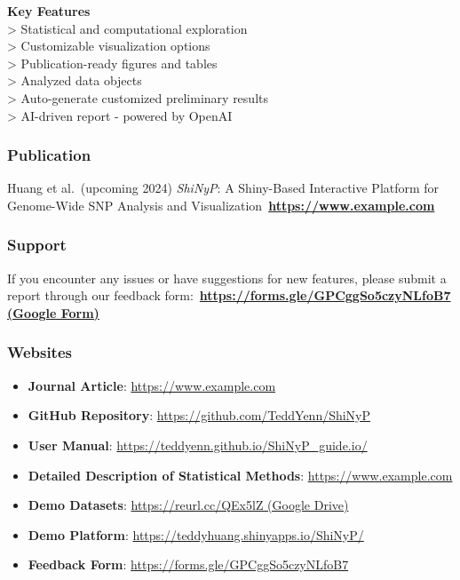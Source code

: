 \documentclass[
]{book}
\begin{document}
\textbf{Key Features}\\
\textgreater{} Statistical and computational exploration\\
\textgreater{} Customizable visualization options\\
\textgreater{} Publication-ready figures and tables\\
\textgreater{} Analyzed data objects\\
\textgreater{} Auto-generate customized preliminary results\\
\textgreater{} AI-driven report - powered by OpenAI

\subsubsection*{Publication}\label{publication}

Huang et al.~(upcoming 2024) \emph{ShiNyP}: A Shiny-Based Interactive Platform for Genome-Wide SNP Analysis and Visualization~\href{https://www.example.com/}{\textbf{https://www.example.com}}

\subsubsection*{Support}\label{support}

If you encounter any issues or have suggestions for new features, please submit a report through our feedback form:~\href{https://forms.gle/GPCggSo5czyNLfoB7}{\textbf{https://forms.gle/GPCggSo5czyNLfoB7 (Google Form)}}

\subsubsection*{Websites}\label{websites}

\begin{itemize}
\item
  \textbf{Journal Article}: \href{https://www.example.com/}{https://www.example.com}
\item
  \textbf{GitHub Repository}: \url{https://github.com/TeddYenn/ShiNyP}
\item
  \textbf{User Manual}: \url{https://teddyenn.github.io/ShiNyP_guide.io/}
\item
  \textbf{Detailed Description of Statistical Methods}: \href{https://www.example.com/}{https://www.example.com}
\item
  \textbf{Demo Datasets}: \href{https://reurl.cc/QEx5lZ}{https://reurl.cc/QEx5lZ (Google Drive)}
\item
  \textbf{Demo Platform}: \url{https://teddyhuang.shinyapps.io/ShiNyP/}
\item
  \textbf{Feedback Form}: \url{https://forms.gle/GPCggSo5czyNLfoB7}
\end{itemize}
\end{document}
